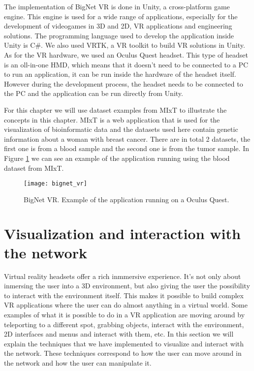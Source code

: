 The implementation of BigNet VR is done in Unity, a cross-platform game engine. This engine is used for a wide range of applications, especially for the development of videogames in 3D and 2D, VR applications and engineering solutions. The programming language used to develop the application inside Unity is C\#. We also used VRTK, a VR toolkit to build VR solutions in Unity. As for the VR hardware, we used an Oculus Quest headset. This type of headset is an oll-in-one HMD, which means that it doesn't need to be connected to a PC to run an application, it can be run inside the hardware of the headset itself. However during the development process, the headset needs to be connected to the PC and the application can be run directly from Unity.

For this chapter we will use dataset examples from MIxT to illustrate the concepts in this chapter. MIxT is a web application that is used for the visualization of bioinformatic data\cite{fjukstad_dumeaux_olsen_lund_hallett_bongo_2017}\cite{dumeaux_fjukstad_interactions_tumor_blood} and the datasets used here contain genetic information about a woman with breast cancer. There are in total 2 datasets, the first one is from a blood sample and the second one is from the tumor sample. In Figure \ref{fig:bignet_vr} we can see an example of the application running using the blood dataset from MIxT.

\begin{figure}[h!]
    \setlength{\tempheight}{15ex}
    \centering
    \texttt{[image: bignet\_vr]}
    \caption{BigNet VR. Example of the application running on a Oculus Quest.}
    \label{fig:bignet_vr}
\end{figure}

\section{Visualization and interaction with the network}
Virtual reality headsets offer a rich inmmersive experience. It's not only about inmersing the user into a 3D environment, but also giving the user the possibility to interact with the environment itself. This makes it possible to build complex VR applications where the user can do almost anything in a virtual world. Some examples of what it is possible to do in a VR application are moving around by teleporting to a different spot, grabbing objects, interact with the environment, 2D interfaces and menus and interact with them, etc. In this section we will explain the techniques that we have implemented to visualize and interact with the network. These techniques correspond to how the user can move around in the network and how the user can manipulate it.

